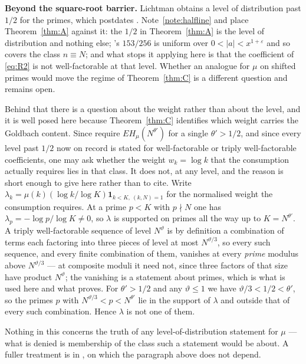 \documentclass[11pt,a4paper]{article}
\theoremstyle{plain}
\theoremstyle{definition}
\theoremstyle{remark}
\begin{document}
\medskip\noindent
\textbf{Beyond the square-root barrier.} Lichtman \cite{Li23} obtains
a level of distribution past $1/2$ for the primes, which postdates
\cite{HL}. Note~\ref{note:halfline} and \cite{P6} place
Theorem~\ref{thm:A} against it: the $1/2$ in Theorem~\ref{thm:A} is
the level of distribution and nothing else; \cite{Li23}'s $153/256$ is
uniform over $0<|a|<x^{1+\varepsilon}$ and so covers the class
$n\equiv N$; and what stops it applying here is that the coefficient
of \eqref{eq:R2} is not well-factorable at that level. Whether an
analogue for $\mu$ on shifted primes would move the regime of
Theorem~\ref{thm:C} is a different question and remains open.

Behind that there is a question about the weight rather than about
the level, and it is well posed here because Theorem~\ref{thm:C}
identifies which weight carries the Goldbach content. Since \cite{HL}
require $EH_\mu(N^{\theta'})$ for a single $\theta'>1/2$, and since
every level past $1/2$ now on record is stated for well-factorable or
triply well-factorable coefficients, one may ask whether the weight
$w_k=\log k$ that the consumption actually requires lies in that
class. It does not, at any level, and the reason is short enough to
give here rather than to cite. Write
$\lambda_k=\mu(k)(\log k/\log K)\mathbf 1_{k<K,\ (k,N)=1}$ for the
normalised weight the consumption requires. At a prime $p<K$ with
$p\nmid N$ one has $\lambda_p=-\log p/\log K\neq0$, so $\lambda$ is
supported on primes all the way up to $K=N^{\theta'}$. A triply
well-factorable sequence of level $N^{\vartheta}$ is by definition a
combination of terms each factoring into three pieces of level at most
$N^{\vartheta/3}$, so every such sequence, and every finite combination
of them, vanishes at every \emph{prime} modulus above
$N^{\vartheta/3}$ --- at composite moduli it need not, since three
factors of that size have product $N^{\vartheta}$; the vanishing is a
statement about primes, which is what is used here and what
\cite[Lemma on vanishing above the split point]{P6} proves. For
$\theta'>1/2$
and any $\vartheta\le1$ we have $\vartheta/3<1/2<\theta'$, so the
primes $p$ with $N^{\vartheta/3}<p<N^{\theta'}$ lie in the support of
$\lambda$ and outside that of every such combination. Hence $\lambda$
is not one of them.

Nothing in this concerns the truth of any level-of-distribution
statement for $\mu$ --- what is denied is membership of the class such
a statement would be about. A fuller treatment is in \cite{P6}, on
which the paragraph above does not depend.
\end{document}
